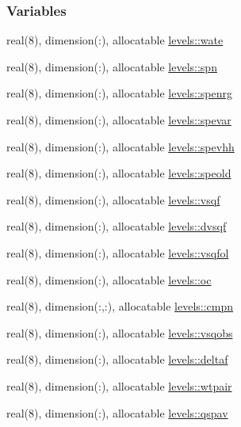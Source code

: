 \subsubsection*{Variables}
\begin{DoxyCompactItemize}
\item 
real(8), dimension(\+:), allocatable \hyperlink{namespacelevels_aeb60866d99b0237db54cd7bb0d04eb81}{levels\+::wate}
\item 
real(8), dimension(\+:), allocatable \hyperlink{namespacelevels_a86fa1ec0b32aa8e96038b6ce7591d586}{levels\+::spn}
\item 
real(8), dimension(\+:), allocatable \hyperlink{namespacelevels_aa8277bbd2042d8f92caeace6331d01d4}{levels\+::spenrg}
\item 
real(8), dimension(\+:), allocatable \hyperlink{namespacelevels_ad173ad37dacc33126c033bd445f91784}{levels\+::spevar}
\item 
real(8), dimension(\+:), allocatable \hyperlink{namespacelevels_acc8c684273be2d8e414d8220a6e83d59}{levels\+::spevhh}
\item 
real(8), dimension(\+:), allocatable \hyperlink{namespacelevels_ac7f33a0c4c0ea6de1a91e776c8f9ce61}{levels\+::speold}
\item 
real(8), dimension(\+:), allocatable \hyperlink{namespacelevels_a99f8fedba7473412f8f1bc3cbc607cd0}{levels\+::vsqf}
\item 
real(8), dimension(\+:), allocatable \hyperlink{namespacelevels_a87fd2946b844fdbb5edd84ea122a7c14}{levels\+::dvsqf}
\item 
real(8), dimension(\+:), allocatable \hyperlink{namespacelevels_aef67aed951be3f696e628e652092e968}{levels\+::vsqfol}
\item 
real(8), dimension(\+:), allocatable \hyperlink{namespacelevels_a9f3b4e034b5daae6cfb8bda259926b32}{levels\+::oc}
\item 
real(8), dimension(\+:,\+:), allocatable \hyperlink{namespacelevels_ac517c8629a25b882f0a7b366e6426eec}{levels\+::cmpn}
\item 
real(8), dimension(\+:), allocatable \hyperlink{namespacelevels_abac62079bff1cfcbd28b41bf5f080083}{levels\+::vsqobs}
\item 
real(8), dimension(\+:), allocatable \hyperlink{namespacelevels_a948be7b0b8534179acced4d11ecf0f8c}{levels\+::deltaf}
\item 
real(8), dimension(\+:), allocatable \hyperlink{namespacelevels_a9e4827753c29903f6526f3426d768585}{levels\+::wtpair}
\item 
real(8), dimension(\+:), allocatable \hyperlink{namespacelevels_aa793d2f1b6ed97cd9c5399e4c1928337}{levels\+::qspav}

\end{DoxyCompactItemize}
